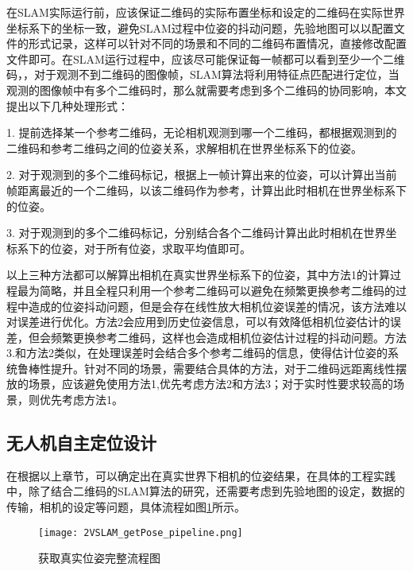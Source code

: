 在SLAM实际运行前，应该保证二维码的实际布置坐标和设定的二维码在实际世界坐标系下的坐标一致，避免SLAM过程中位姿的抖动问题，先验地图可以以配置文件的形式记录，这样可以针对不同的场景和不同的二维码布置情况，直接修改配置文件即可。在SLAM运行过程中，应该尽可能保证每一帧都可以看到至少一个二维码，，对于观测不到二维码的图像帧，SLAM算法将利用特征点匹配进行定位，当观测的图像帧中有多个二维码时，那么就需要考虑到多个二维码的协同影响，本文提出以下几种处理形式：

1. 提前选择某一个参考二维码，无论相机观测到哪一个二维码，都根据观测到的二维码和参考二维码之间的位姿关系，求解相机在世界坐标系下的位姿。

2. 对于观测到的多个二维码标记，根据上一帧计算出来的位姿，可以计算出当前帧距离最近的一个二维码，以该二维码作为参考，计算出此时相机在世界坐标系下的位姿。

3. 对于观测到的多个二维码标记，分别结合各个二维码计算出此时相机在世界坐标系下的位姿，对于所有位姿，求取平均值即可。

以上三种方法都可以解算出相机在真实世界坐标系下的位姿，其中方法1的计算过程最为简略，并且全程只利用一个参考二维码可以避免在频繁更换参考二维码的过程中造成的位姿抖动问题，但是会存在线性放大相机位姿误差的情况，该方法难以对误差进行优化。方法2会应用到历史位姿信息，可以有效降低相机位姿估计的误差，但会频繁更换参考二维码，这样也会造成相机位姿估计过程的抖动问题。方法3.和方法2类似，在处理误差时会结合多个参考二维码的信息，使得估计位姿的系统鲁棒性提升。针对不同的场景，需要结合具体的方法，对于二维码远距离线性摆放的场景，应该避免使用方法1,优先考虑方法2和方法3；对于实时性要求较高的场景，则优先考虑方法1。

\subsection{无人机自主定位设计}
\label{sec:2.4.3}
在根据以上章节，可以确定出在真实世界下相机的位姿结果，在具体的工程实践中，除了结合二维码的SLAM算法的研究，还需要考虑到先验地图的设定，数据的传输，相机的设定等问题，具体流程如图\ref{fig:2VSLAM_getPose_pipeline}所示。
\begin{figure}[h] %
  \centering
  \texttt{[image: 2VSLAM\_getPose\_pipeline.png]}
  \caption{获取真实位姿完整流程图}
  \label{fig:2VSLAM_getPose_pipeline}
\end{figure}

